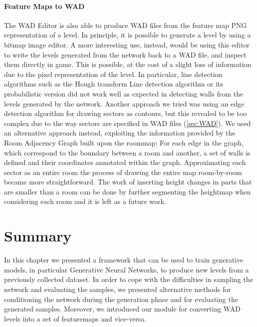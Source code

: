 \paragraph{Feature Maps to WAD} The WAD Editor is also able to produce WAD files from the feature map PNG representation of a level. In principle, it is possible to generate a level by  using a bitmap image editor. A more interesting use, instead, would be using this editor to write the levels generated from the network back to a WAD file, and inspect them directly in game. This is possible, at the cost of a slight loss of information due to the pixel representation of the level. In particular, line detection algorithms such as the Hough transform Line detection algorithm \cite{hough} or its probabilistic version \cite{houghprob} did not work well as expected in detecting walls from the levels generated by the network. Another approach we tried was using an edge detection algorithm for drawing sectors as contours, but this revealed to be too complex due to the way sectors are specified in WAD files (\ref{sec:WAD}). We used an alternative approach instead, exploiting the information provided by the Room Adjacency Graph built upon the \gls{roommap}: For each edge in the graph, which correspond to the boundary between a room and another, a set of walls is defined and their coordinates annotated within the graph. Approximating each sector as an entire room the process of drawing the entire map room-by-room became more straightforward. The work of inserting height changes in parts that are smaller than a room can be done by further segmenting the heightmap when considering each room and it is left as a future work.

\section{Summary} 
In this chapter we presented a framework that can be used to train generative models, in particular Generative Neural Networks, to produce new levels from a previously collected dataset. In order to cope with the difficulties in sampling the network and evaluating the samples, we presented alternative methods for conditioning the network during the generation phase and for evaluating the generated samples. Moreover, we introduced our module for converting WAD levels into a set of \glspl{featuremap} and vice-versa.